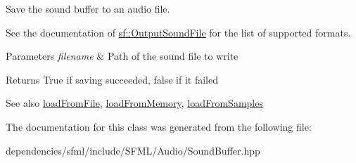 Save the sound buffer to an audio file. 

See the documentation of \hyperlink{classsf_1_1_output_sound_file}{sf\+::\+Output\+Sound\+File} for the list of supported formats.


\begin{DoxyParams}{Parameters}
{\em filename} & Path of the sound file to write\\
\hline
\end{DoxyParams}
\begin{DoxyReturn}{Returns}
True if saving succeeded, false if it failed
\end{DoxyReturn}
\begin{DoxySeeAlso}{See also}
\hyperlink{classsf_1_1_sound_buffer_a2be6a8025c97eb622a7dff6cf2594394}{load\+From\+File}, \hyperlink{classsf_1_1_sound_buffer_af8cfa5599739a7edae69c5cba273d33f}{load\+From\+Memory}, \hyperlink{classsf_1_1_sound_buffer_a42d51ce4bb3b60c7ea06f63c273fd063}{load\+From\+Samples} 
\end{DoxySeeAlso}


The documentation for this class was generated from the following file\+:\begin{DoxyCompactItemize}
\item 
dependencies/sfml/include/\+S\+F\+M\+L/\+Audio/Sound\+Buffer.\+hpp\end{DoxyCompactItemize}
